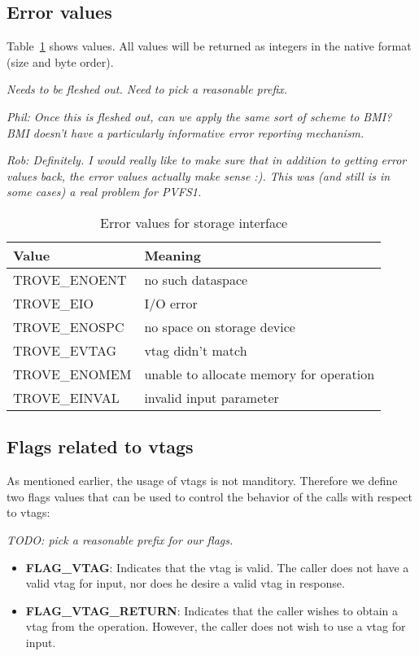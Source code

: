 \documentclass[10pt]{article} %
\begin{document}
\subsection{Error values}

Table~\ref{table:storage_errors} shows values.  All values will be returned as
integers in the native format (size and byte order).

\emph{Needs to be fleshed out.  Need to pick a reasonable prefix.}

\emph{Phil:  Once this is fleshed out, can we apply the same sort of
scheme to BMI?  BMI doesn't have a particularly informative error
reporting mechanism.} 

\emph{Rob: Definitely.  I would really like to make sure that in
addition to getting error values back, the error values actually make
sense :).  This was (and still is in some cases) a real problem for
PVFS1.}

\begin{table}
\caption{Error values for storage interface}
\begin{center}
\begin{tabular}{|l|l|}
\hline
Value & Meaning \\
\hline
TROVE\_ENOENT & no such dataspace \\
TROVE\_EIO    & I/O error \\
TROVE\_ENOSPC & no space on storage device \\
TROVE\_EVTAG  & vtag didn't match \\
TROVE\_ENOMEM & unable to allocate memory for operation \\
TROVE\_EINVAL & invalid input parameter \\
\hline
\end{tabular}
\end{center}
\label{table:storage_errors}
\end{table}

\subsection{Flags related to vtags}

As mentioned earlier, the usage of vtags is not manditory.  Therefore we
define two flags values that can be used to control the behavior of the calls
with respect to vtags:

\emph{TODO: pick a reasonable prefix for our flags.}

\begin{itemize}
\item \textbf{FLAG\_VTAG}:  Indicates that the vtag is valid.
The caller does not have a valid vtag for input, nor does he desire a
valid vtag in response.
\item \textbf{FLAG\_VTAG\_RETURN}:  Indicates that the caller wishes to obtain
a vtag from the operation.  However, the caller does not wish to use a
vtag for input.  
\end{itemize}
\end{document}

